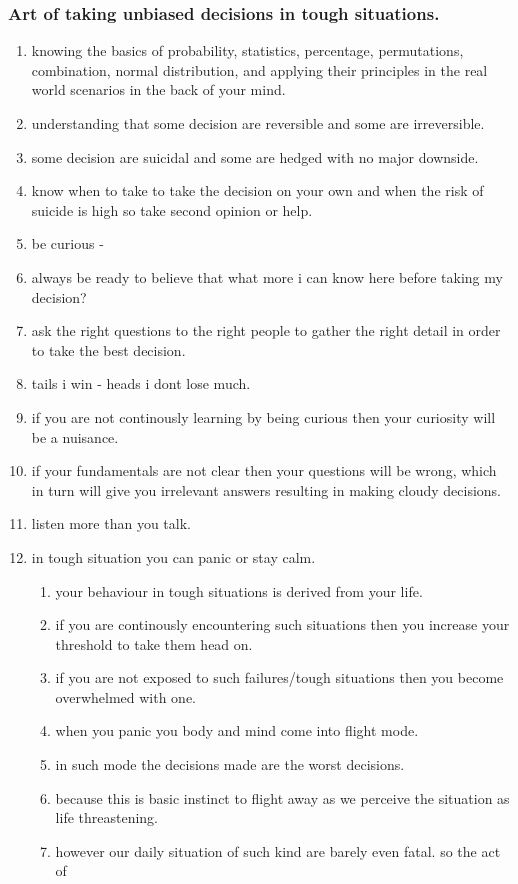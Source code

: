 \documentclass[11pt]{article}
\begin{document}
\subsubsection{Art of taking unbiased decisions in tough situations.}
\label{sec:org42fda03}
\begin{enumerate}
\item knowing the basics of probability, statistics, percentage, permutations, combination, normal distribution,  and applying their principles in the real world scenarios in the back of your mind.
\label{sec:orgafce1f2}
\item understanding that some decision are reversible and some are irreversible.
\label{sec:org9666b79}
\item some decision are suicidal and some are hedged with no major downside.
\label{sec:org9b79cb1}
\item know when to take to take the decision on your own and when the risk of suicide is high so take second opinion or help.
\label{sec:org0162076}
\item be curious -
\label{sec:org5c4c0f0}
\item always be ready to believe that what more i can know here before taking my decision?
\label{sec:org9563884}
\item ask the right questions to the right people to gather the right detail in order to take the best decision.
\label{sec:org196ac5f}
\item tails i win - heads i dont lose much.
\label{sec:orgc535cf5}
\item if you are not continously learning by being curious then your curiosity will be a nuisance.
\label{sec:orga512836}
\item if your fundamentals are not clear then your questions will be wrong, which in turn will give you irrelevant answers resulting in making cloudy decisions.
\label{sec:org88dcd03}
\item listen more than you talk.
\label{sec:org358860e}
\item in tough situation you can panic or stay calm.
\label{sec:orgdab13f3}
\begin{enumerate}
\item your behaviour in tough situations is derived from your life.
\label{sec:orgbd6ad31}
\item if you are continously encountering such situations then you increase your threshold to take them head on.
\label{sec:orgaed7347}
\item if you are not exposed to such failures/tough situations then you become overwhelmed with one.
\label{sec:orgab6bbab}
\item when you panic you body and mind come into flight mode.
\label{sec:orgd3383be}
\item in such mode the decisions made are the worst decisions.
\label{sec:org99684fb}
\item because this is basic instinct to flight away as we perceive the situation as life threastening.
\label{sec:org6e3a5eb}
\item however our daily situation of such kind are barely even fatal. so the act of
\label{sec:org92fc0a3}
\end{enumerate}
\end{enumerate}
\end{document}
